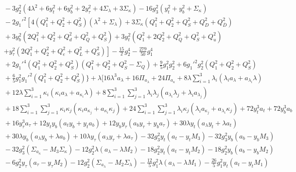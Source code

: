 \documentclass[preprint,amsmath,amssymb,aps,superscriptaddress,prd,showpacs,floatfix,nofootinbib]{revtex4-1}
\begin{document}
\begin{subequations}
\begin{align}
&{}-3g_2^2\left ( 4\lambda^2+6y_t^2+6y_b^2+2y_\tau^2+4\Sigma_\lambda+3\Sigma_\kappa\right )-16g_3^2\left ( y_t^2+y_b^2+\Sigma_\kappa \right )\nonumber\\
&{}-2g_1'^2\left [ 4\left ( Q_1^2+Q_2^2+Q_S^2\right )\left ( \lambda^2 +\Sigma_\lambda \right )+3\Sigma_\kappa\left ( Q_1^2+Q_2^2+Q_S^2+Q_D^2+Q_{\overline{D}}^2\right )\right .\nonumber\\
&{}+3y_b^2\left ( 2Q_1^2+Q_2^2+Q_d^2+Q_Q^2+Q_S^2 \right )+3y_t^2\left ( Q_1^2+2Q_2^2+Q_Q^2+Q_S^2+Q_u^2\right )\nonumber\\
&{}\left.+y_\tau^2\left ( 2Q_1^2+Q_2^2+Q_e^2+Q_L^2+Q_S^2\right )\right ]-\frac{15}{2}g_2^4-\frac{279}{50}g_1^4\nonumber\\
&{}+2g_1'^4\left ( Q_1^2+Q_2^2+Q_S^2 \right )\left (Q_1^2+Q_2^2+Q_S^2-\Sigma_{Q}\right )+\frac{9}{5}g_1^2g_2^2+6g_1'^2g_2^2\left ( Q_1^2+Q_2^2+Q_S^2\right )\nonumber\\
&{}+\frac{6}{5}g_1^2g_1'^2\left ( Q_1^2+Q_2^2+Q_S^2 \right ) \bigg \}+\lambda \bigg [16\lambda^3a_{\lambda}+16\Pi_{a_\lambda}+24\Pi_{a_\kappa}+8\lambda\sum_{i=1}^3\lambda_i\left ( \lambda_i a_{\lambda}+a_{\lambda_i}\lambda\right )\nonumber\\
&{}+12\lambda\sum_{i=1}^3\kappa_i\left ( \kappa_i a_\lambda + a_{\kappa_i} \lambda\right )+8\sum_{i=1}^3\sum_{j=1}^3\lambda_i\lambda_j\left ( a_{\lambda_i}\lambda_j+\lambda_ia_{\lambda_j}\right )\nonumber\\
&{}+18\sum_{i=1}^3\sum_{j=1}^3\kappa_i\kappa_j\left ( \kappa_i a_{\kappa_j}+a_{\kappa_i}\kappa_j\right )+24\sum_{i=1}^3\sum_{j=1}^3\lambda_i\kappa_j\left ( \lambda_i a_{\kappa_j}+a_{\lambda_i}\kappa_j\right )+72y_t^3a_t+72y_b^3a_b\nonumber\\
&{}+16y_\tau^3a_\tau+12y_ty_b\left ( a_ty_b+y_ta_b\right )+12y_by_\tau\left ( a_by_\tau+y_ba_\tau\right )+30\lambda y_t\left ( a_{\lambda}y_t+\lambda a_t\right )\nonumber\\
&{}+30\lambda y_b\left ( a_{\lambda}y_b+\lambda a_b\right )+10\lambda y_\tau\left ( a_{\lambda}y_\tau+\lambda a_{\tau}\right )-32g_3^2y_t\left ( a_t-y_tM_3\right )-32g_3^2y_b\left ( a_b-y_bM_3\right )\nonumber\\
&{}-32g_3^2\left ( \Sigma_{a_\kappa}-M_3\Sigma_\kappa\right )-12g_2^2\lambda\left ( a_\lambda-\lambda M_2\right )-18g_2^2y_t\left ( a_t-y_tM_2\right )-18g_2^2y_b\left ( a_b-y_bM_2\right )\nonumber\\
&{}-6g_2^2y_\tau\left ( a_\tau-y_\tau M_2\right )-12g_2^2\left ( \Sigma_{a_\lambda}-M_2\Sigma_\lambda \right )-\frac{12}{5}g_1^2\lambda\left ( a_{\lambda}-\lambda M_1\right )-\frac{26}{5}g_1^2y_t\left ( a_t-y_tM_1\right )\nonumber\\

\end{align}
\end{subequations}
\end{document}
